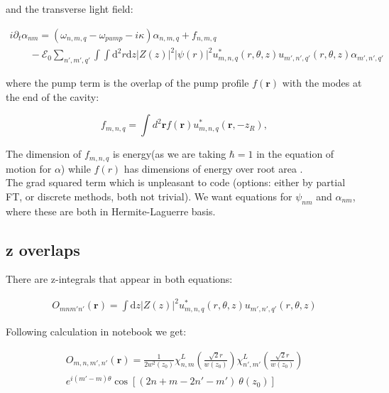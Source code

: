 \documentclass[a4paper,twocolumn,nobalancelastpage]{revtex4-1}
\newcommand{\vect}[1]{\mathbf{#1}}
\begin{document}
and the transverse light field:

\begin{widetext}

\begin{multline}
\label{eq:eqnalpha}
 i\partial_t \alpha_{nm}=(\omega_{n,m,q}-\omega_{pump}-i\kappa)\alpha_{n,m,q}+f_{n,m,q} \\ \qquad - \mathcal{E}_0\sum_{n',m',q'} \int \int \mathrm{d}^2r \mathrm{d}z |Z(z)|^2 |\psi(r)|^2 u^*_{m,n,q}(r,\theta,z) u_{m',n',q'}(r,\theta,z)\alpha_{m',n',q'}
\end{multline}

\end{widetext}

where the pump term is the overlap of the pump profile $f(\vect{r})$ with the modes at the end of the cavity:

\begin{equation}
\label{eq:pumptermdef}
  f_{m,n,q} = \int d^2\vect{r} f(\vect{r}) u^\ast_{m,n,q}(\vect{r}, - z_R),
\end{equation}

The dimension of $f_{m,n,q}$ is energy(as we
are taking $\hbar=1$ in the equation of motion for $\alpha$) while $f(r)$ has dimensions of energy over root area .\\


The grad squared term which is unpleasant to code (options: either by partial FT, or discrete methods, both not trivial). We want equations for $\psi_{nm}$ and $\alpha_{nm}$, where these are both in Hermite-Laguerre basis.

\subsection{z overlaps}

There are z-integrals that appear in both equations:

\begin{align}
O_{mnm'n'}(\vect{r})=\int\mathrm{d}z |Z(z)|^2 u^*_{m,n,q}(r,\theta,z) u_{m',n',q'}(r,\theta,z)
\end{align}

Following calculation in notebook we get:

\begin{multline}
\label{eq:zoverlap}
O_{m,n,m',n'}(\vect{r})=\frac{1}{2w^2(z_0)} \chi_{n,m}^L  \left(\frac{\sqrt{2}r}{w(z_{0})}\right) \chi_{n',m'}^L  \left(\frac{\sqrt{2}r}{w(z_{0})}\right) \\
e^{i(m'-m)\theta}  \cos\left[(2n+m-2n'-m')\ \theta(z_0)\right]
\end{multline}
\end{document}
